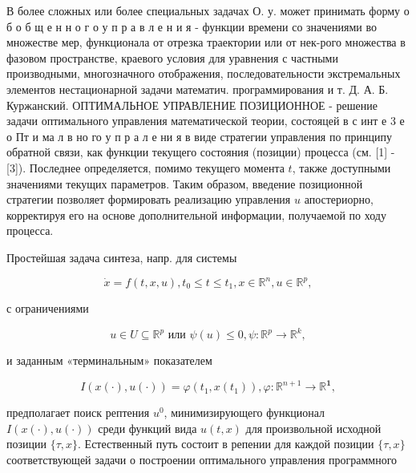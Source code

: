 \documentclass[10pt]{article}
\begin{document}
В более сложных или более специальных задачах О. у. может принимать форму о б о б щ е н н о г о у п р а в л е н и я - функции времени со значениями во множестве мер, функционала от отрезка траектории или от нек-рого множества в фазовом пространстве, краевого условия для уравнения с частными производными, многозначного отображения, последовательности экстремальных элементов нестационарной задачи математич. программирования и т. Д. А. Б. Куржанский. ОПТИМАЛЬНОЕ УПРАВЛЕНИЕ ПОЗИЦИОННОЕ - решение задачи оптимального управления математической теории, состояцей в с инт е 3 е о Пт и ма л в но го у п р а л е ни я в виде стратегии управления по принципу обратной связи, как функции текущего состояния (позиции) процесса (см. [1] - [3]). Последнее определяется, помимо текущего момента $t$, также доступными значениями текущих параметров. Таким образом, введение позиционной стратегии позволяет формировать реализацию управления $u$ апостериорно, корректируя его на основе дополнительной информации, получаемой по ходу процесса.



Простейшая задача синтеза, напр. для системы



\[

\dot{x}=f(t, x, u), t_{0} \leqslant t \leqslant t_{1}, x \in \mathbb{R}^{n}, u \in \mathbb{R}^{p},

\]



с ограничениями



\[

u \in U \subseteq \mathbb{R}^{p} \text { или } \psi(u) \leqslant 0, \psi: \mathbb{R}^{p} \longrightarrow \mathbb{R}^{k},

\]



и заданным «терминальным» показателем



\[

I(x(\cdot), u(\cdot))=\varphi\left(t_{1}, x\left(t_{1}\right)\right), \varphi: \mathbb{R}^{n+1} \longrightarrow \mathbb{R}^{\mathbf{1}},

\]



предполагает поиск рептения $u^{0}$, минимизирующего функционал $I(x(\cdot), u(\cdot))$ среди функций вида $u(t, x)$ для произвольной исходной позиции $\{\tau, x\}$. Естественный путь состоит в репении для каждой позиции $\{\tau, x\}$ соответствующей задачи о построении оптимального управления программного
\end{document}
